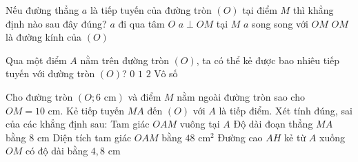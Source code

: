 
\begin{ex}%
	Nếu đường thẳng $a$ là tiếp tuyến của đường tròn $(O)$ tại điểm $M$ thì khẳng định nào sau đây đúng?
	\choice
	{$a$ đi qua tâm $O$}
	{\True $a \perp OM$ tại $M$}
	{$a$ song song với $OM$}
	{$OM$ là đường kính của $(O)$}
\end{ex}

\begin{ex}%
	Qua một điểm $A$ nằm trên đường tròn $(O)$, ta có thể kẻ được bao nhiêu tiếp tuyến với đường tròn $(O)$?
	\choice
	{$0$}
	{\True $1$}
	{$2$}
	{Vô số}
\end{ex}

\begin{ex}%
	Cho đường tròn $(O; 6\text{ cm})$ và điểm $M$ nằm ngoài đường tròn sao cho $OM = 10\text{ cm}$. Kẻ tiếp tuyến $MA$ đến $(O)$ với $A$ là tiếp điểm. Xét tính đúng, sai của các khẳng định sau:
	\choiceTF
	{\True Tam giác $OAM$ vuông tại $A$}
	{\True Độ dài đoạn thẳng $MA$ bằng $8\text{ cm}$}
	{Diện tích tam giác $OAM$ bằng $48\text{ cm}^2$}
	{\True Đường cao $AH$ kẻ từ $A$ xuống $OM$ có độ dài bằng $4{,}8\text{ cm}$}
\end{ex}

